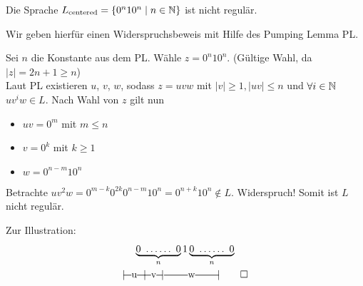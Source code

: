 %
\begin{Bsp*}
        Die Sprache $L_\text{centered}=\{0^n10^n \mid n\in\mathbb{N}\}$ ist nicht regulär.
        
        Wir geben hierfür einen Widerspruchsbeweis mit Hilfe des Pumping Lemma \ac{PL}.
        
        Sei $n$ die Konstante aus dem \ac{PL}. Wähle $z=0^n10^n$. 
        (Gültige Wahl, da $|z|=2n+1\geq n$)\\
        Laut PL existieren $u$, $v$, $w$, sodass $z=uvw$ mit $|v|\geq 1, |uv|\leq n$ und $\forall i \in \mathbb{N}$ $uv^iw \in L$. 
        Nach Wahl von $z$ gilt nun
  \begin{itemize}
  \item $uv = 0^m$ mit $m\leq n$
  \item $v = 0^k$ mit $k\geq 1$
  \item $w = 0^{n-m}10^n$ 
  \end{itemize}
  Betrachte $uv^2w = 0^{m-k}0^{2k}0^{n-m}10^n = 0^{n+k}10^n \notin L$. Widerspruch!
  Somit ist $L$ nicht regulär.
  
  Zur Illustration:
  \begin{gather*}
    \underbrace{0\ \dots\dots\ 0}_{n} 1 \underbrace{0\ \dots\dots\ 0}_{n}\\
    |\!\ruleplaceholder[u]{\widthof{0\ \dots }} \!|\! \ruleplaceholder[v]{\widthof{\dots 0}}\!|%
    \ruleplaceholder[w]{\widthof{\ \ \ $1\ \dots\dots\ 1$}}\!|
    \qedhere
  \end{gather*}
\end{Bsp*}

